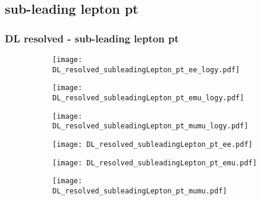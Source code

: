 \documentclass[aspectratio=169,8pt]{beamer}
\begin{document}
\subsection{sub-leading lepton pt}
\begin{frame}
\frametitle{DL resolved - sub-leading lepton pt}
\begin{figure}
\captionsetup[subfigure]{labelformat=empty}
\begin{subfigure}{0.32\textwidth}
\texttt{[image: DL\_resolved\_subleadingLepton\_pt\_ee\_logy.pdf]}
\vspace*{-0.15cm}
\end{subfigure}
\hfil
\begin{subfigure}{0.32\textwidth}
\texttt{[image: DL\_resolved\_subleadingLepton\_pt\_emu\_logy.pdf]}
\vspace*{-0.15cm}
\end{subfigure}
\hfil
\begin{subfigure}{0.32\textwidth}
\texttt{[image: DL\_resolved\_subleadingLepton\_pt\_mumu\_logy.pdf]}
\vspace*{-0.15cm}
\end{subfigure}
\hfil
\begin{subfigure}{0.32\textwidth}
\texttt{[image: DL\_resolved\_subleadingLepton\_pt\_ee.pdf]}
\vspace*{-0.15cm}
\end{subfigure}
\hfil
\begin{subfigure}{0.32\textwidth}
\texttt{[image: DL\_resolved\_subleadingLepton\_pt\_emu.pdf]}
\vspace*{-0.15cm}
\end{subfigure}
\hfil
\begin{subfigure}{0.32\textwidth}
\texttt{[image: DL\_resolved\_subleadingLepton\_pt\_mumu.pdf]}
\vspace*{-0.15cm}
\end{subfigure}
\hfil
\end{figure}
\end{frame}
\newpage
\end{document}
